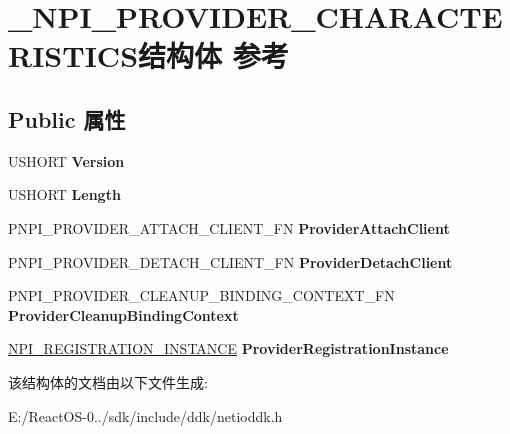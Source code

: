 \hypertarget{struct___n_p_i___p_r_o_v_i_d_e_r___c_h_a_r_a_c_t_e_r_i_s_t_i_c_s}{}\section{\+\_\+\+N\+P\+I\+\_\+\+P\+R\+O\+V\+I\+D\+E\+R\+\_\+\+C\+H\+A\+R\+A\+C\+T\+E\+R\+I\+S\+T\+I\+C\+S结构体 参考}
\label{struct___n_p_i___p_r_o_v_i_d_e_r___c_h_a_r_a_c_t_e_r_i_s_t_i_c_s}
\subsection*{Public 属性}
\begin{DoxyCompactItemize}
\item 
\mbox{\label{struct___n_p_i___p_r_o_v_i_d_e_r___c_h_a_r_a_c_t_e_r_i_s_t_i_c_s_a040788f1958515d80c899c66bb1de452}} 
U\+S\+H\+O\+RT {\bfseries Version}
\item 
\mbox{\label{struct___n_p_i___p_r_o_v_i_d_e_r___c_h_a_r_a_c_t_e_r_i_s_t_i_c_s_a4bd1d8eba14cf45cb9d0727d689b8240}} 
U\+S\+H\+O\+RT {\bfseries Length}
\item 
\mbox{\label{struct___n_p_i___p_r_o_v_i_d_e_r___c_h_a_r_a_c_t_e_r_i_s_t_i_c_s_a779c9d54793302d985b631cf3708706b}} 
P\+N\+P\+I\+\_\+\+P\+R\+O\+V\+I\+D\+E\+R\+\_\+\+A\+T\+T\+A\+C\+H\+\_\+\+C\+L\+I\+E\+N\+T\+\_\+\+FN {\bfseries Provider\+Attach\+Client}
\item 
\mbox{\label{struct___n_p_i___p_r_o_v_i_d_e_r___c_h_a_r_a_c_t_e_r_i_s_t_i_c_s_ae010f48984647cf9a4ff148d766ada1b}} 
P\+N\+P\+I\+\_\+\+P\+R\+O\+V\+I\+D\+E\+R\+\_\+\+D\+E\+T\+A\+C\+H\+\_\+\+C\+L\+I\+E\+N\+T\+\_\+\+FN {\bfseries Provider\+Detach\+Client}
\item 
\mbox{\label{struct___n_p_i___p_r_o_v_i_d_e_r___c_h_a_r_a_c_t_e_r_i_s_t_i_c_s_a427b3b2ec946f1d043564322734ab190}} 
P\+N\+P\+I\+\_\+\+P\+R\+O\+V\+I\+D\+E\+R\+\_\+\+C\+L\+E\+A\+N\+U\+P\+\_\+\+B\+I\+N\+D\+I\+N\+G\+\_\+\+C\+O\+N\+T\+E\+X\+T\+\_\+\+FN {\bfseries Provider\+Cleanup\+Binding\+Context}
\item 
\mbox{\label{struct___n_p_i___p_r_o_v_i_d_e_r___c_h_a_r_a_c_t_e_r_i_s_t_i_c_s_ad084482ca7600ea67b6def02658a3989}} 
\hyperlink{struct___n_p_i___r_e_g_i_s_t_r_a_t_i_o_n___i_n_s_t_a_n_c_e}{N\+P\+I\+\_\+\+R\+E\+G\+I\+S\+T\+R\+A\+T\+I\+O\+N\+\_\+\+I\+N\+S\+T\+A\+N\+CE} {\bfseries Provider\+Registration\+Instance}
\end{DoxyCompactItemize}


该结构体的文档由以下文件生成\+:\begin{DoxyCompactItemize}
\item 
E\+:/\+React\+O\+S-\/0../sdk/include/ddk/netioddk.\+h\end{DoxyCompactItemize}
